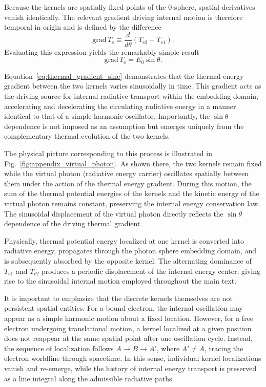 \documentclass[%
 reprint,
 amsmath,amssymb,
 aps,
 prb,
]{revtex4-2}
\numberwithin{equation}{section}
\begin{document}
Because the kernels are spatially fixed points of the 0-sphere, spatial derivatives vanish identically.
The relevant gradient driving internal motion is therefore temporal in origin and is defined by the difference
\begin{equation}
\mathrm{grad}\,T_{\mathrm{e}} \equiv \frac{d}{d\theta}\left(T_{\mathrm{e2}} - T_{\mathrm{e1}}\right).
\end{equation}
Evaluating this expression yields the remarkably simple result
\begin{equation}
\mathrm{grad}\,T_{\mathrm{e}} = E_0 \sin\theta .
\label{eq:thermal_gradient_sine}
\end{equation}

Equation~\eqref{eq:thermal_gradient_sine} demonstrates that the thermal energy gradient between the two kernels varies sinusoidally in time.
This gradient acts as the driving source for internal radiative transport within the embedding domain, accelerating and decelerating the circulating radiative energy in a manner identical to that of a simple harmonic oscillator.
Importantly, the $\sin\theta$ dependence is not imposed as an assumption but emerges uniquely from the complementary thermal evolution of the two kernels.

The physical picture corresponding to this process is illustrated in Fig.~\ref{fig:appendix_virtual_photon}.
As shown there, the two kernels remain fixed while the virtual photon (radiative energy carrier) oscillates spatially between them under the action of the thermal energy gradient.
During this motion, the sum of the thermal potential energies of the kernels and the kinetic energy of the virtual photon remains constant, preserving the internal energy conservation law.
The sinusoidal displacement of the virtual photon directly reflects the $\sin\theta$ dependence of the driving thermal gradient.

Physically, thermal potential energy localized at one kernel is converted into radiative energy, propagates through the photon sphere embedding domain, and is subsequently absorbed by the opposite kernel.
The alternating dominance of $T_{\mathrm{e1}}$ and $T_{\mathrm{e2}}$ produces a periodic displacement of the internal energy center, giving rise to the sinusoidal internal motion employed throughout the main text.

It is important to emphasize that the discrete kernels themselves are not persistent spatial entities.
For a bound electron, the internal oscillation may appear as a simple harmonic motion about a fixed location.
However, for a free electron undergoing translational motion, a kernel localized at a given position does not reappear at the same spatial point after one oscillation cycle.
Instead, the sequence of localization follows $A \rightarrow B \rightarrow A'$, where $A' \neq A$, tracing the electron worldline through spacetime.
In this sense, individual kernel localizations vanish and re-emerge, while the history of internal energy transport is preserved as a line integral along the admissible radiative paths.
\end{document}
